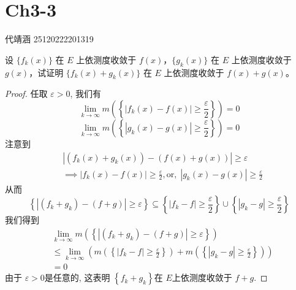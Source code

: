 \documentclass[../main.tex]{subfiles}
\begin{document}
\ifSubfilesClassLoaded{

    
    \setcounter{chapter}{2}
}{}

\chapter{ Ch3-3 }
 代靖涵 25120222201319
\begin{exercise}{}{}
设 $\{f_k(x)\}$ 在 $E$ 上依测度收敛于 $f(x)$，$\{g_k(x)\}$ 在 $E$ 上依测度收敛于 $g(x)$，试证明 $\{f_k(x)+g_k(x)\}$ 在 $E$ 上依测度收敛于 $f(x)+g(x)$。
\end{exercise}

\begin{proof}
     任取 \(   \varepsilon > 0  \), 我们有 \[
     \lim_{k\to \infty}m\left( \left\{ \left| f_{k}\left( x \right)-f\left( x \right)   \right|\ge  \frac{ \varepsilon  }{2 }   \right\} \right)= 0 
     \]  \[
     \lim_{k\to \infty}m\left( \left\{ \left| g_{k}\left( x \right)-g\left( x \right)   \right| \ge \frac{ \varepsilon  }{2 }  \right\} \right) = 0
     \]注意到 \[
     \begin{aligned}
    & \left| \left( f_{k}\left( x \right)+ g_{k}\left( x \right)   \right)-\left( f\left( x \right)+ g\left( x \right)   \right)   \right|\ge  \varepsilon \\ 
      &\implies   \left| f_{k}\left( x \right)-f\left( x \right)   \right|\ge \frac{ \varepsilon  }{2 },\text{or}, \; \left| g_{k}\left( x \right)-g\left( x \right)   \right|\ge \frac{ \varepsilon  }{2 }    
     \end{aligned}
     \]从而 \[
     \left\{ \left| \left( f_{k}+ g_{k} \right)-\left( f+ g \right)  \right|\ge  \varepsilon    \right\}\subseteq \left\{ \left| f_{k}-f \right|\ge \frac{ \varepsilon  }{2 }   \right\}\cup \left\{ \left| g_{k}-g \right|\ge \frac{ \varepsilon  }{2 }   \right\}
     \]我们得到 \[
     \begin{aligned}
    & \lim_{k\to \infty}m\left( \left\{ \left| \left( f_{k}+ g_{k} \right)-\left( f+ g \right)   \right|\ge  \varepsilon   \right\} \right)\\ 
      &\le \lim  _{k\to \infty}\left( m\left( \left\{ \left| f_{k}-f \right|\ge \frac{ \varepsilon  }{2 }   \right\} \right)+ m\left( \left\{ \left| g_{k}-g \right|\ge \frac{ \varepsilon  }{2 }   \right\} \right)   \right)\\ 
       &= 0 
     \end{aligned}
     \]由于 \(   \varepsilon > 0  \)是任意的, 这表明 \(  \left\{ f_{k}+ g_{k} \right\}  \)在 \(  E  \)上依测度收敛于 \(  f+ g  \).   
\end{proof}
\end{document}
